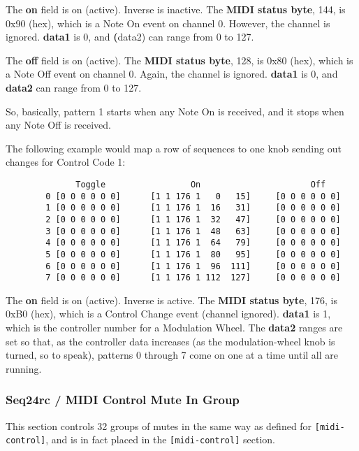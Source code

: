    The \textbf{on} field is on (active).  Inverse is inactive.  The
   \textbf{MIDI status byte}, 144, is 0x90 (hex), which is a Note On event
   on channel 0.  However, the channel is ignored.  \textbf{data1} is 0, and
   \textbf(data2) can range from 0 to 127.

   The \textbf{off} field is on (active).  The \textbf{MIDI status byte},
   128, is 0x80 (hex), which is a Note Off event on channel 0.  Again, the
   channel is ignored.  \textbf{data1} is 0, and \textbf{data2} can range
   from 0 to 127.

   So, basically, pattern 1 starts when any Note On is received, and
   it stops when any Note Off is received.

   The following example would map a row of sequences to one knob sending
   out changes for Control Code 1:

   \begin{verbatim}
	          Toggle                 On                      Off
        0 [0 0 0 0 0 0]      [1 1 176 1   0   15]     [0 0 0 0 0 0]
        1 [0 0 0 0 0 0]      [1 1 176 1  16   31]     [0 0 0 0 0 0]
        2 [0 0 0 0 0 0]      [1 1 176 1  32   47]     [0 0 0 0 0 0]
        3 [0 0 0 0 0 0]      [1 1 176 1  48   63]     [0 0 0 0 0 0]
        4 [0 0 0 0 0 0]      [1 1 176 1  64   79]     [0 0 0 0 0 0]
        5 [0 0 0 0 0 0]      [1 1 176 1  80   95]     [0 0 0 0 0 0]
        6 [0 0 0 0 0 0]      [1 1 176 1  96  111]     [0 0 0 0 0 0]
        7 [0 0 0 0 0 0]      [1 1 176 1 112  127]     [0 0 0 0 0 0]
   \end{verbatim}

   The \textbf{on} field is on (active).  Inverse is active.  The
   \textbf{MIDI status byte}, 176, is 0xB0 (hex), which is a Control Change
   event (channel ignored).  \textbf{data1} is 1, which is the controller
   number for a Modulation Wheel.  The \textbf{data2} ranges are set so
   that, as the controller data increases (as the modulation-wheel knob is
   turned, so to speak), patterns 0 through 7 come on one at a time until
   all are running.

\subsubsection{Seq24rc / MIDI Control Mute In Group}
\label{subsubsec:seq24_rc_file_midi_control_mute_in_group}

   This section controls 32 groups of mutes in the same way as 
	defined for \texttt{[midi-control]}, and is in fact placed in the
   \texttt{[midi-control]} section.


